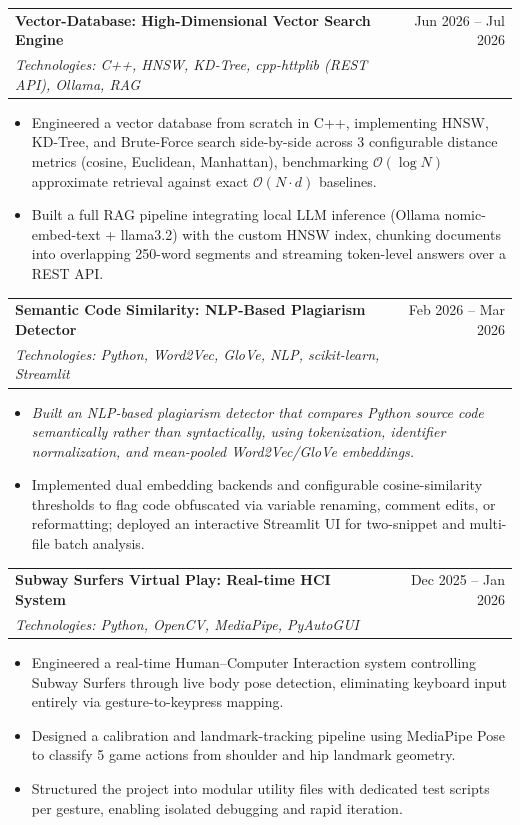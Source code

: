 \documentclass[letterpaper,11pt]{article}
\makeatletter
\newcommand{\resumeItem}[1]{
  \item\small{
    {#1 \vspace{-2pt}}
  }
}
\newcommand{\resumeSubheading}[4]{
  \vspace{-2pt}\item
    \begin{tabular*}{\textwidth}[t]{l@{\extracolsep{\fill}}r}
      \textbf{#1} & #2 \\
      \textit{\small#3} & \textit{\small #4} \\
    \end{tabular*}\vspace{-7pt}
}
\newcommand{\resumeItemListStart}{\begin{itemize}[leftmargin=0.15in, label=\textbullet]}
\newcommand{\resumeItemListEnd}{\end{itemize}\vspace{-5pt}}
\makeatother
\begin{document}
      \resumeSubheading
        {\textbf{Vector-Database: High-Dimensional Vector Search Engine}}{Jun 2026 -- Jul 2026}
        {Technologies: C++, HNSW, KD-Tree, cpp-httplib (REST API), Ollama, RAG}{}
        \vspace{-5pt}
        \resumeItemListStart
          \resumeItem{Engineered a vector database from scratch in C++, implementing HNSW, KD-Tree, and Brute-Force search side-by-side across 3 configurable distance metrics (cosine, Euclidean, Manhattan), benchmarking $\mathcal{O}(\log N)$ approximate retrieval against exact $\mathcal{O}(N \cdot d)$ baselines.}
          \resumeItem{Built a full RAG pipeline integrating local LLM inference (Ollama nomic-embed-text + llama3.2) with the custom HNSW index, chunking documents into overlapping 250-word segments and streaming token-level answers over a REST API.}
        \resumeItemListEnd

      \resumeSubheading
        {\textbf{Semantic Code Similarity: NLP-Based Plagiarism Detector}}{Feb 2026 -- Mar 2026}
        {Technologies: Python, Word2Vec, GloVe, NLP, scikit-learn, Streamlit}{}
        \vspace{-5pt}
        \begin{itemize}[leftmargin=0.15in, label={}]
          \item \small \textit{Built an NLP-based plagiarism detector that compares Python source code semantically rather than syntactically, using tokenization, identifier normalization, and mean-pooled Word2Vec/GloVe embeddings.}
        \end{itemize}
        \vspace{-5pt}
        \resumeItemListStart
          \resumeItem{Implemented dual embedding backends and configurable cosine-similarity thresholds to flag code obfuscated via variable renaming, comment edits, or reformatting; deployed an interactive Streamlit UI for two-snippet and multi-file batch analysis.}
        \resumeItemListEnd

      \resumeSubheading
        {\textbf{Subway Surfers Virtual Play: Real-time HCI System}}{Dec 2025 -- Jan 2026}
        {Technologies: Python, OpenCV, MediaPipe, PyAutoGUI}{}
        \vspace{-5pt}
        \resumeItemListStart
          \resumeItem{Engineered a real-time Human--Computer Interaction system controlling Subway Surfers through live body pose detection, eliminating keyboard input entirely via gesture-to-keypress mapping.}
          \resumeItem{Designed a calibration and landmark-tracking pipeline using MediaPipe Pose to classify 5 game actions from shoulder and hip landmark geometry.}
          \resumeItem{Structured the project into modular utility files with dedicated test scripts per gesture, enabling isolated debugging and rapid iteration.}
        \resumeItemListEnd
\end{document}
